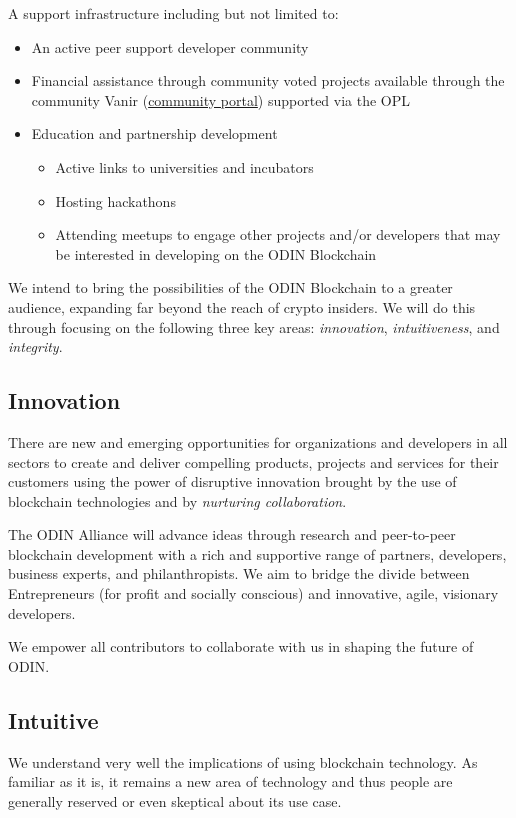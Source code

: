 A support infrastructure including but not limited to:
\begin{itemize}
   \item An active peer support developer community
   \item Financial assistance through community voted projects available through the community Vanir (\href{https://docs.google.com/document/d/15YAuXnc-3y06keG302AfK-6QCZ7PkonSIGuMRxncdcw/edit?disco=AAAACD6XbTI&ts=5b47a26b#heading=h.c0p3cw59hwku}{community portal}) supported via the OPL
   \item Education and partnership development
   \begin{itemize}
      \item Active links to universities and incubators
      \item Hosting hackathons
      \item Attending meetups to engage other projects and/or developers that may be interested in developing on the ODIN Blockchain
   \end{itemize}
\end{itemize}

We intend to bring the possibilities of the ODIN Blockchain to a greater audience, expanding far beyond the reach of crypto insiders. We will do this through focusing on the following three key areas: \textit{innovation}, \textit{intuitiveness}, and \textit{integrity}. 

\subsection{Innovation}
There are new and emerging opportunities for organizations and developers in all sectors to create and deliver compelling products, projects and services for their customers using the power of disruptive innovation brought by the use of blockchain technologies and by \textit{nurturing collaboration}.

The ODIN Alliance will advance ideas through research and peer-to-peer blockchain development with a rich and supportive range of partners, developers, business experts, and philanthropists. We aim to bridge the divide between Entrepreneurs (for profit and socially conscious) and innovative, agile, visionary developers.  

We empower all contributors to collaborate with us in shaping the future of ODIN.

\subsection{​Intuitive}
We understand very well the implications of using blockchain technology. As familiar as it is, it remains a new area of technology and thus people are generally reserved or even skeptical about its use case.


